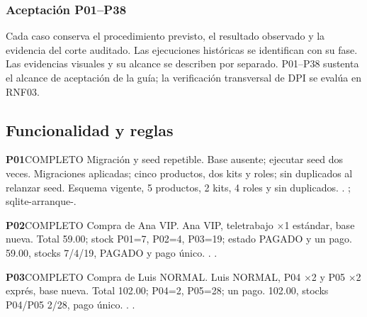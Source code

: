 \subsubsection{Aceptación P01--P38}
Cada caso conserva el procedimiento previsto, el resultado observado y la evidencia del corte auditado. Las ejecuciones históricas se identifican con su fase. Las evidencias visuales y su alcance se describen por separado. P01--P38 sustenta el alcance de aceptación de la guía; la verificación transversal de DPI se evalúa en RNF03.
\subsection*{Funcionalidad y reglas}
\par\medskip\noindent\begin{minipage}{\linewidth}
\noindent\textbf{\large P01}\quad\textsf{COMPLETO}
 Migración y seed repetible.
 Base ausente; ejecutar seed dos veces.
 Migraciones aplicadas; cinco productos, dos kits y roles; sin duplicados al relanzar seed.
 Esquema vigente, 5 productos, 2 kits, 4 roles y sin duplicados.
 . ; sqlite-arranque-.
\end{minipage}\par
\par\medskip\noindent\begin{minipage}{\linewidth}
\noindent\textbf{\large P02}\quad\textsf{COMPLETO}
 Compra de Ana VIP.
 Ana VIP, teletrabajo $\times$1 estándar, base nueva.
 Total 59.00; stock P01=7, P02=4, P03=19; estado PAGADO y un pago.
 59.00, stocks 7/4/19, PAGADO y pago único.
 . .
\end{minipage}\par
\par\medskip\noindent\begin{minipage}{\linewidth}
\noindent\textbf{\large P03}\quad\textsf{COMPLETO}
 Compra de Luis NORMAL.
 Luis NORMAL, P04 $\times$2 y P05 $\times$2 exprés, base nueva.
 Total 102.00; P04=2, P05=28; un pago.
 102.00, stocks P04/P05 2/28, pago único.
 . .
\end{minipage}\par
